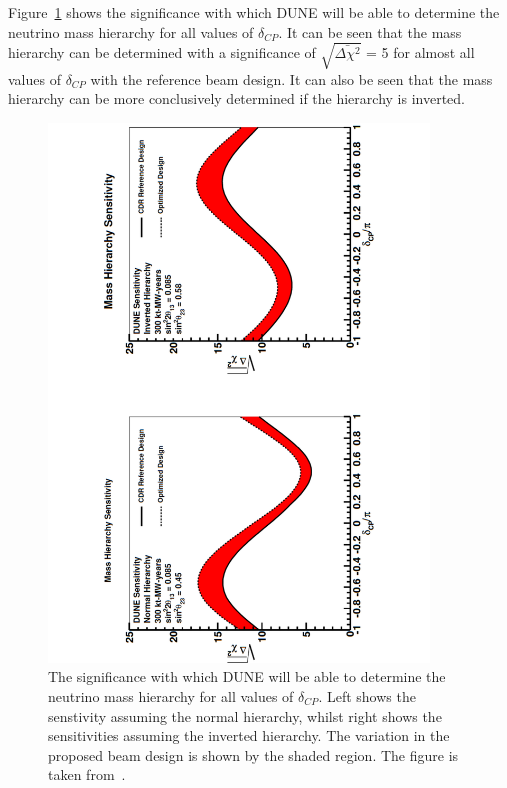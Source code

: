 Figure~\ref{fig:DUNEMassHierarchy} shows the significance with which DUNE will be able to determine the neutrino mass hierarchy for all values of $\delta_{CP}$. It can be seen that the mass hierarchy can be determined with a significance of $\sqrt{\bar{\Delta{\chi^2}}}$ = 5 for almost all values of $\delta_{CP}$ with the reference beam design. It can also be seen that the mass hierarchy can be more conclusively determined if the hierarchy is inverted. \\

\begin{figure}[h!]
  \centering
  \includegraphics[width=0.9\textwidth]{DUNEMassHierarchy}
  \caption[The significance with which DUNE will be able to determine the neutrino mass hierarchy for all values of $\delta_{CP}$]
          {The significance with which DUNE will be able to determine the neutrino mass hierarchy for all values of $\delta_{CP}$. Left shows the senstivity assuming the normal hierarchy, whilst right shows the sensitivities assuming the inverted hierarchy. The variation in the proposed beam design is shown by the shaded region. The figure is taken from~\citep{DUNECDR_V2}.}
  \label{fig:DUNEMassHierarchy}
\end{figure}

